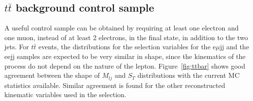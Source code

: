 \documentclass{cmspaper}
\begin{document}
\begin{linenumbers}
\subsection{$t\bar{t}$ background control sample} \label{sec:ttbarControlSample}
A useful control sample can be obtained by 
requiring at least one electron and one muon, instead of at least 2 electrons, 
in the final state, in addition to the two jets. 
For $t\bar{t}$ events, the distributions for the selection variables
for the e$\mu$jj and the eejj samples
are expected to be very similar in shape, since the kinematics 
of the process do not depend 
on the nature of the lepton. 
Figure~\ref{fig:ttbar} shows good agreement between 
the shape of $M_{lj}$ and $S_{T}$ distributions 
with the current MC statistics available. Similar agreement 
is found for the other reconstructed kinematic variables 
used in the selection. 


\end{linenumbers}
\end{document}
